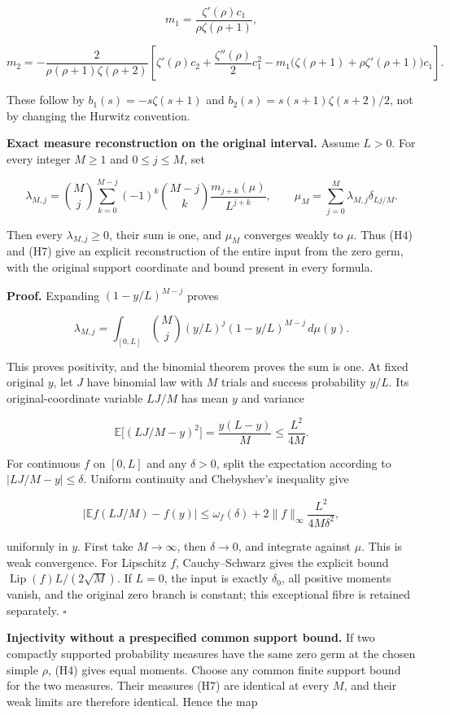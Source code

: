 \[
m_1=\frac{\zeta'(\rho)c_1}{\rho\zeta(\rho+1)},
\tag{H5}
\]

\[
m_2=-\frac{2}{\rho(\rho+1)\zeta(\rho+2)}
\left[
\zeta'(\rho)c_2+\frac{\zeta''(\rho)}2c_1^2
-m_1\bigl(\zeta(\rho+1)+\rho\zeta'(\rho+1)\bigr)c_1
\right].\tag{H6}
\]

These follow by \(b_1(s)=-s\zeta (s+1)\) and \(b_2(s)=s(s+1)\zeta (s+2)/2\), not by changing the Hurwitz convention.

\textbf{Exact measure reconstruction on the original interval.} Assume \(L>0\). For every integer \(M\ge 1\) and \(0\le j\le M\), set

\[
\lambda_{M,j}
=\binom Mj\sum_{k=0}^{M-j}(-1)^k\binom{M-j}{k}
\frac{m_{j+k}(\mu)}{L^{j+k}},\qquad
\mu_M=\sum_{j=0}^M\lambda_{M,j}\delta_{Lj/M}.
\tag{H7}
\]

Then every \(\lambda _{M,j}\ge 0\), their sum is one, and \(\mu _M\) converges weakly to \(\mu\). Thus (H4) and (H7) give an explicit reconstruction of the entire input from the zero germ, with the original support coordinate and bound present in every formula.

\textbf{Proof.} Expanding \((1-y/L)^{M-j}\) proves

\[
\lambda_{M,j}=\int_{[0,L]}\binom Mj
(y/L)^j(1-y/L)^{M-j}\,d\mu(y).
\]

This proves positivity, and the binomial theorem proves the sum is one. At fixed original \(y\), let \(J\) have binomial law with \(M\) trials and success probability \(y/L\). Its original-coordinate variable \(LJ/M\) has mean \(y\) and variance

\[
\mathbb E\bigl[(LJ/M-y)^2\bigr]
=\frac{y(L-y)}M\le\frac{L^2}{4M}.
\tag{H8}
\]

For continuous \(f\) on \([0,L]\) and any \(\delta >0\), split the expectation according to \(|LJ/M-y|\le \delta\). Uniform continuity and Chebyshev's inequality give

\[
\left|\mathbb E f(LJ/M)-f(y)\right|
\le\omega_f(\delta)+2\|f\|_\infty\frac{L^2}{4M\delta^2},
\]

uniformly in \(y\). First take \(M\longrightarrow \infty\), then \(\delta \longrightarrow 0\), and integrate against \(\mu\). This is weak convergence. For Lipschitz \(f\), Cauchy--Schwarz gives the explicit bound \(\operatorname{Lip}(f)L/(2\sqrt M)\). If \(L=0\), the input is exactly \(\delta _0\), all positive moments vanish, and the original zero branch is constant; this exceptional fibre is retained separately. \(\square\)

\textbf{Injectivity without a prespecified common support bound.} If two compactly supported probability measures have the same zero germ at the chosen simple \(\rho\), (H4) gives equal moments. Choose any common finite support bound for the two measures. Their measures (H7) are identical at every \(M\), and their weak limits are therefore identical. Hence the map

